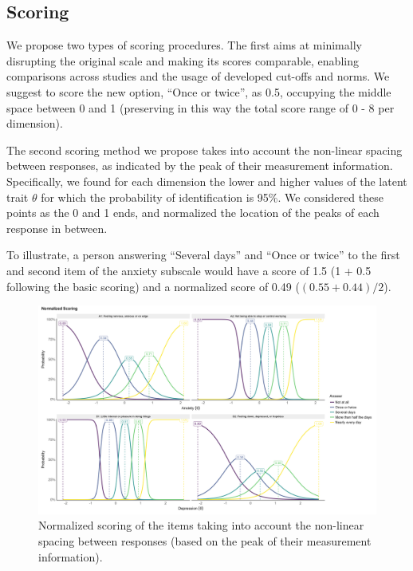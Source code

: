 \documentclass[
  man,floatsintext]{apa6}
\begin{document}
\hypertarget{scoring}{%
\subsection{Scoring}\label{scoring}}

We propose two types of scoring procedures. The first aims at
minimally disrupting the original scale and making its scores comparable, enabling comparisons across studies and the usage of developed cut-offs and norms. We suggest to score the new option, ``Once or twice'', as 0.5, occupying the middle space between 0 and 1 (preserving in this way the total score range of 0 - 8 per dimension).

The second scoring method we propose takes into account the non-linear spacing between responses, as indicated by the peak of their measurement information. Specifically, we found for each dimension the lower and higher values of the latent trait \(\theta\) for which the probability of identification is 95\%. We considered these points as the 0 and 1 ends, and normalized the location of the peaks of each response in between.

To illustrate, a person answering ``Several days'' and ``Once or twice'' to the first and second item of the anxiety subscale would have a score of 1.5 (1 + 0.5 following the basic scoring) and a normalized score of 0.49 (\((0.55 + 0.44) / 2\)).

\begin{figure}
\includegraphics[width=1\linewidth]{../../figures/figure2} \caption{Normalized scoring of the items taking into account the non-linear spacing between responses (based on the peak of their measurement information).}\label{fig:unnamed-chunk-3}
\end{figure}
\end{document}

